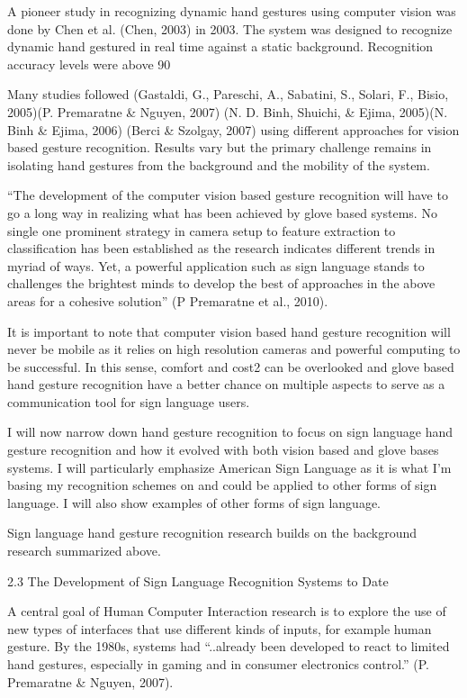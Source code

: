 A pioneer study in recognizing dynamic hand gestures using computer vision was done by Chen et al. (Chen, 2003) in 2003. The system was designed to recognize dynamic hand gestured in real time against a static background. Recognition accuracy levels were above 90%

Many studies followed (Gastaldi, G., Pareschi, A., Sabatini, S., Solari, F., Bisio, 2005)(P. Premaratne \& Nguyen, 2007) (N. D. Binh, Shuichi, \& Ejima, 2005)(N. Binh \& Ejima, 2006) (Berci \& Szolgay, 2007) using different approaches for vision based gesture recognition. Results vary but the primary challenge remains in isolating hand gestures from the background and the mobility of the system. 


``The development of the computer vision based gesture recognition will have to go a long way in realizing what has been achieved by glove based systems. No single one prominent strategy in camera setup to feature extraction to classification has been established as the research indicates different trends in myriad of ways. Yet, a powerful application such as sign language stands to challenges the brightest minds to develop the best of approaches in the above areas for a cohesive solution'' (P Premaratne et al., 2010). 

It is important to note that computer vision based hand gesture recognition will never be mobile as it relies on high resolution cameras and powerful computing to be successful. In this sense, comfort and cost2 can be overlooked and glove based hand gesture recognition have a better chance on multiple aspects to serve as a communication tool for sign language users. 

I will now narrow down hand gesture recognition to focus on sign language hand gesture recognition and how it evolved with both vision based and glove bases systems. I will particularly emphasize American Sign Language as it is what I’m basing my recognition schemes on and could be applied to other forms of sign language. I will also show examples of other forms of sign language. 

Sign language hand gesture recognition research builds on the background research summarized above. 


2.3 The Development of Sign Language Recognition Systems to Date

A central goal of Human Computer Interaction research is to explore the use of new types of interfaces that use different kinds of inputs, for example human gesture. By the 1980s, systems had ``..already been developed to react to limited hand gestures, especially in gaming and in consumer electronics control.'' (P. Premaratne \& Nguyen, 2007).

